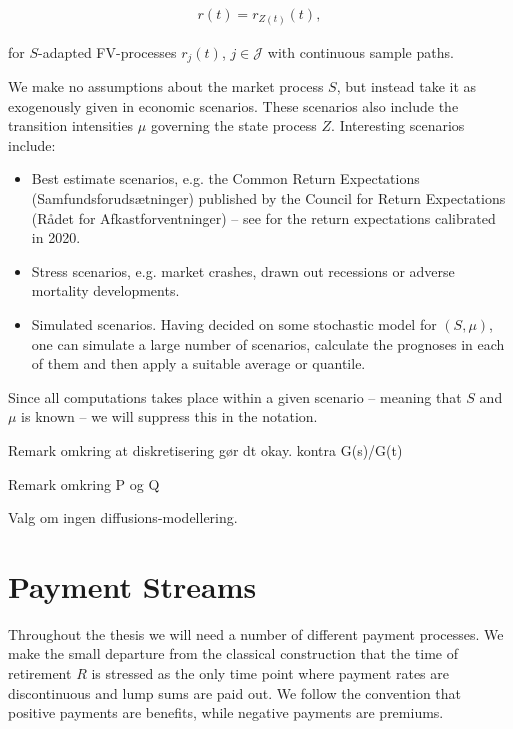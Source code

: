 \documentclass{book}
\newcommand{\1}[1]{\mathbbm{1}_{\left\lbrace #1 \right\rbrace}}
\theoremstyle{break}
\theoremstyle{remark}
\newenvironment{remark}
  {\pushQED{\qed}\renewcommand{\qedsymbol}{\scalebox{1.4}{$\circ$}}\remarkx}
  {\popQED\endremarkx}
\numberwithin{equation}{section}
\begin{document}
\begin{align*}
	r(t) = r_{Z(t)}(t),
\end{align*}

for $S$-adapted FV-processes $r_j(t)$, $j \in \mathcal{J}$ with continuous sample paths.

We make no assumptions about the market process $S$, but instead take it as exogenously given in economic scenarios. These scenarios also include the transition intensities $\mu$ governing the state process $Z$. Interesting scenarios include:

\begin{itemize}
	\item Best estimate scenarios, e.g. the Common Return Expectations (Samfundsforudsætninger) published by the Council for Return Expectations (Rådet for Afkastforventninger) -- see \cite{ReturnExpectations2020} for the return expectations calibrated in 2020.
	\item Stress scenarios, e.g. market crashes, drawn out recessions or adverse mortality developments.
	\item Simulated scenarios. Having decided on some stochastic model for $(S,\mu)$, one can simulate a large number of scenarios, calculate the prognoses in each of them and then apply a suitable average or quantile.
\end{itemize}

Since all computations takes place within a given scenario -- meaning that $S$ and $\mu$ is known -- we will suppress this in the notation.

\begin{remark}
	Remark omkring at diskretisering gør dt okay. kontra G(s)/G(t)
\end{remark}

\begin{remark}
	Remark omkring P og Q
\end{remark}

Valg om ingen diffusions-modellering.

\section{Payment Streams}

Throughout the thesis we will need a number of different payment processes. We make the small departure from the classical construction that the time of retirement $R$ is stressed as the only time point where payment rates are discontinuous and lump sums are paid out. We follow the convention that positive payments are benefits, while negative payments are premiums.
\end{document}
